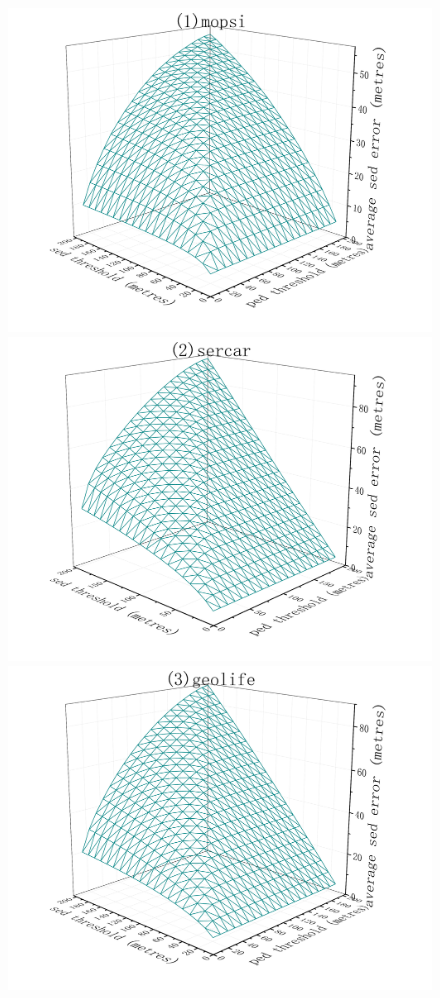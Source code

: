 \begin{figure}[tb!]
	\centering
	\includegraphics[scale = 0.56]{figures/Fig-BITT-mopsi-sed-error.png}\hspace{1ex}
	\includegraphics[scale = 0.56]{figures/Fig-BITT-sercar-sed-error.png}\hspace{1ex}
	\includegraphics[scale = 0.56]{figures/Fig-BITT-geolife-sed-error.png}\hspace{1ex}

\end{figure}
